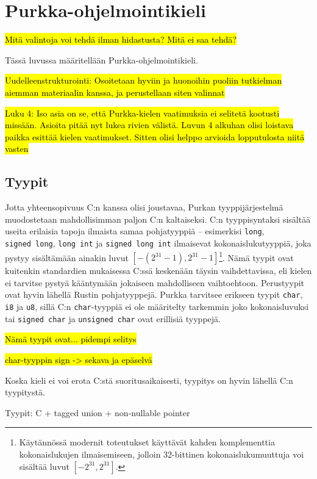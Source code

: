 \section{Purkka-ohjelmointikieli}
\label{sec:purkka}

\hl{Mitä valintoja voi tehdä ilman hidastusta? Mitä ei saa tehdä?}

Tässä luvussa määritellään Purkka-ohjelmointikieli.

\hl{Uudelleenstrukturointi: Osoitetaan hyviin ja huonoihin puoliin tutkielman
aiemman materiaalin kanssa, ja perustellaan siten valinnat}

\hl{ Luku 4: Iso asia on se, että Purkka-kielen vaatimuksia ei selitetä
kootusti missään. Asioita pitää nyt lukea rivien välistä. Luvun 4 alkuhan olisi
loistava paikka esittää kielen vaatimukset. Sitten olisi helppo arvioida
lopputulosta niitä vasten }

\subsection{Tyypit}

Jotta yhteensopivuus C:n kanssa olisi joustavaa, Purkan tyyppijärjestelmä
muodostetaan mahdollisimman paljon C:n kaltaiseksi. C:n tyyppisyntaksi sisältää
useita erilaisia tapoja ilmaista samaa pohjatyyppiä -- esimerkisi
\texttt{long}, \texttt{signed~long}, \texttt{long~int} ja
\texttt{signed~long~int} ilmaisevat kokonaislukutyyppiä, joka pystyy
sisältämään ainakin luvut $[-(2^{31} - 1), 2^{31}-1]$\footnote{Käytännössä
modernit toteutukset käyttävät kahden komplementtia kokonaislukujen
ilmaisemiseen, jolloin 32-bittinen kokonaislukumuuttuja voi sisältää luvut
$[-2^{31}, 2^{31}]$.}\citationneeded. Nämä tyypit ovat kuitenkin standardien
mukaisessa C:ssä keskenään täysin vaihdettavissa, eli kielen ei tarvitse pystyä
kääntymään jokaiseen mahdolliseen vaihtoehtoon. Perustyypit ovat hyvin lähellä
Rustin pohjatyyppejä\citationneeded. Purkka tarvitsee erikseen tyypit
\texttt{char}, \texttt{i8} ja \texttt{u8}, sillä C:n \texttt{char}-tyyppiä ei
ole määritelty tarkemmin joko kokonaisluvuksi tai 
\texttt{signed char} ja \texttt{unsigned char} ovat erillisiä tyyppejä.

\hl{Nämä tyypit ovat... pidempi selitys}

\hl{char-tyyppin sign -> sekava ja epäselvä }

Koska kieli ei voi erota C:stä suoritusaikaisesti, tyypitys on hyvin lähellä
C:n tyypitystä.

Tyypit:
 C + tagged union + non-nullable pointer

